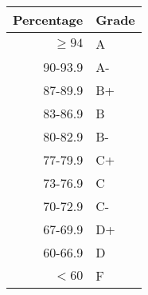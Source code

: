 \documentclass{tufte-handout}
\begin{document}
\begin{margintable}
\begin{tabular}{rl}
Percentage & Grade \\
\hline 
$\ge94$ & A \\
90-93.9 & A- \\
87-89.9 & B+ \\
83-86.9 & B \\
80-82.9 & B- \\
77-79.9 & C+ \\
73-76.9 & C \\
70-72.9 & C- \\
67-69.9 & D+ \\
60-66.9 & D \\
$<60$ & F \\
\hline
\end{tabular}
\end{margintable}
\end{document}
